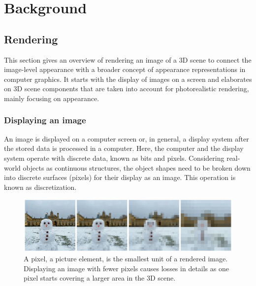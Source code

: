 \chapter{Background}

\section{Rendering}

This section gives an overview of rendering an image of a 3D scene to connect the image-level appearance with a broader concept of appearance representations in computer graphics.  It starts with the display of images on a screen and elaborates on 3D scene components that are taken into account for photorealistic rendering, mainly focusing on appearance. 

\subsection{Displaying an image}
An image is displayed on a computer screen or, in general, a display system after the stored data is processed in a computer. Here, the computer and the display system operate with discrete data, known as bits and pixels. Considering real-world objects as continuous structures, the object shapes need to be broken down into discrete surfaces (pixels) for their display as an image. This operation is known as discretization. 

\begin{figure}[ht]
  \centering

    \includegraphics[width=\linewidth]{Images/pixelate_image_snowman.png}

   \caption{A pixel, a picture element, is the smallest unit of a rendered image. Displaying an image with fewer pixels causes losses in details as one pixel starts covering a larger area in the 3D scene.}
   \label{fig:colour-approximate}
\end{figure}

